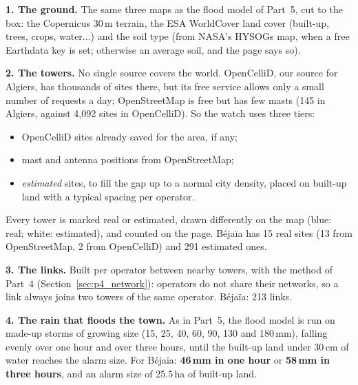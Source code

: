 \textbf{1. The ground.} The same three maps as the flood model of Part~5, cut to the box: the Copernicus 30\,m terrain,
the ESA WorldCover land cover (built-up, trees, crops, water...) and the soil type (from NASA's HYSOGs map, when a free
Earthdata key is set; otherwise an average soil, and the page says so).

\textbf{2. The towers.} No single source covers the world. OpenCelliD, our source for Algiers, has thousands of sites
there, but its free service allows only a small number of requests a day; OpenStreetMap is free but has few masts
(145 in Algiers, against 4,092 sites in OpenCelliD). So the watch uses three tiers:
\begin{itemize}[itemsep=0.1em]
\item OpenCelliD sites already saved for the area, if any;
\item mast and antenna positions from OpenStreetMap;
\item \emph{estimated} sites, to fill the gap up to a normal city density, placed on built-up land with a typical spacing
per operator.
\end{itemize}
Every tower is marked real or estimated, drawn differently on the map (blue: real; white: estimated), and counted on
the page. Béjaïa has 15 real sites (13 from OpenStreetMap, 2 from OpenCelliD) and 291 estimated ones.

\textbf{3. The links.} Built per operator between nearby towers, with the method of Part~4 (Section~\ref{sec:p4_network}):
operators do not share their networks, so a link always joins two towers of the same operator. Béjaïa: 213 links.

\textbf{4. The rain that floods the town.} As in Part~5, the flood model is run on made-up storms of growing size
(15, 25, 40, 60, 90, 130 and 180\,mm), falling evenly over one hour and over three hours, until the built-up land under
30\,cm of water reaches the alarm size. For Béjaïa: \textbf{46\,mm in one hour} or \textbf{58\,mm in three hours}, and
an alarm size of 25.5\,ha of built-up land.

